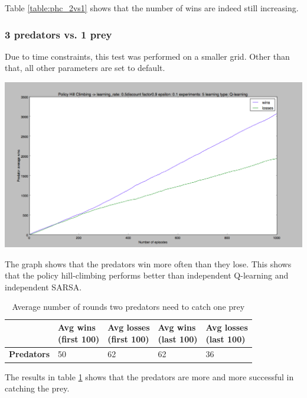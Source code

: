 Table \ref{table:phc_2vs1} shows that the number of wins are indeed still increasing.

\subsubsection{3 predators vs. 1 prey}
Due to time constraints, this test was performed on a smaller grid. Other than that, all other parameters are set to default. 

\begin{center}
	\includegraphics[scale=0.3]{phc_3predators_5by5_graph}
	\label{graph:phc_3v1}
\end{center}

The graph shows that the predators win more often than they lose. This shows that the policy hill-climbing performs better than independent Q-learning and independent SARSA.

\begin{table}[H]
\begin{center}
\begin{tabular}{| l | l | l | l | l |}
\hline
 & \parbox{2cm}{\textbf{Avg wins \\ (first 100)}} & \parbox{2cm}{\textbf{Avg losses \\ (first 100)}} & \parbox{2cm}{\textbf{Avg wins \\ (last 100)}} & \parbox{2cm}{\textbf{Avg losses \\ (last 100)}} \\
\hline
\textbf{Predators} & 50 & 62 & 62 & 36 \\
\hline
\end{tabular}
\caption{Average number of rounds two predators need to catch one prey}
\label{table:phc_3vs1}
\end{center}
\end{table}

The results in table \ref{table:phc_3vs1} shows that the predators are more and more successful in catching the prey. 